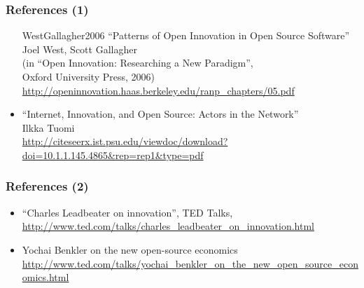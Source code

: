 
\begin{frame}
\frametitle{References (1)}

\begin{itemize}
\item [WestGallagher2006]
  ``Patterns of Open Innovation in Open Source Software'' \\
  Joel West, Scott Gallagher \\
  (in ``Open Innovation: Researching a New Paradigm'', \\
  Oxford University Press, 2006) \\
  {\small \url{http://openinnovation.haas.berkeley.edu/ranp_chapters/05.pdf}}
\item ``Internet, Innovation, and Open Source: Actors in the Network'' \\
  Ilkka Tuomi \\
  {\small \url{http://citeseerx.ist.psu.edu/viewdoc/download?doi=10.1.1.145.4865&rep=rep1&type=pdf}}
\end{itemize}

\end{frame}



\begin{frame}
\frametitle{References (2)}

\begin{itemize}
\item ``Charles Leadbeater on innovation'', TED Talks, \\
  {\small \url{http://www.ted.com/talks/charles_leadbeater_on_innovation.html}}
\item Yochai Benkler on the new open-source economics \\
  {\small \url{http://www.ted.com/talks/yochai_benkler_on_the_new_open_source_economics.html}}
\end{itemize}
\end{frame}

